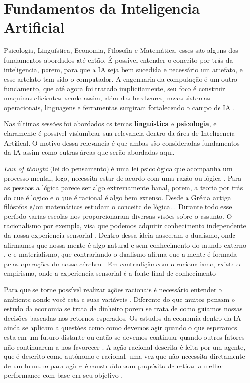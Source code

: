\section{Fundamentos da Inteligencia Artificial}

Psicologia, Linguística, Economia, Filosofia e Matemática, esses são alguns dos fundamentos abordados até então. É possível entender o conceito por trás da inteligencia, porem, para que a IA seja bem sucedida e necessário um artefato, e esse artefato tem sido o computador. A engenharia da computação é um outro fundamento, que até agora foi tratado implicitamente, seu foco é construir maquinas eficientes, sendo assim, além dos hardwares, novos sistemas operacionais, linguagens e ferramentas surgiram fortalecendo o campo de IA \cite[13-14]{russell2003artificial}.


Nas últimas sessões foi abordados os temas \textbf{linguistica} e \textbf{psicologia}, e claramente é possivel vislumbrar sua relevancia dentro da área de Inteligencia Artifical. O motivo dessa relevancia é que ambas são consideradas fundamentos da IA assim como outras áreas que serão abordadas aqui.

\textit{Law of thought} (lei do pensamento) é uma lei psicológica que acompanha um processo mental, logo, necessita estar de acordo com uma razão ou lógica \cite[289-291]{frege1956thought}. Para as pessoas a lógica parece ser algo extremamente banal, porem, a teoria por trás do que é logico e o que é racional é algo bem extenso. Desde a Grécia antiga filósofos e/ou matemáticos estudam o conceito de lógica. \cite[4-5]{russell2003artificial}. Durante todo esse período varias escolas nos proporcionaram diversas visões sobre o assunto. O racionalismo por exemplo, visa que podemos adquirir conhecimento independente da nossa experiencia sensorial \cite{rationalismvsempiricism}. Dentro dessa ideia nasceram o dualismo, onde afirmamos que nossa mente é algo natural e sem conhecimento do mundo externo \cite[7]{descartes2013rene}, e o materialismo, que contrariando o dualismo afirma que a mente é formada pelas operações do nosso cérebro \cite[6]{russell2003artificial}.
Em contradição com o racionalismo, existe o empirismo, onde a experiencia sensorial é a fonte final de conhecimento \cite{rationalismvsempiricism}.

Para que se torne possível realizar ações racionais é necessário entender o ambiente aonde você esta e suas variáveis \cite[99]{simon1955behavioral}. Diferente do que muitos pensam o estudo da economia se trata de dinheiro porem se trata de como guiamos nossas decisões baseadas nos retornos esperados. Os estudos da economia dentro da IA ainda se aplicam a questões como como devemos agir quando o que esperamos esta em um futuro distante ou então se devemos continuar quando outros fatores não continuarem a nos favorecer \cite[9]{russell2003artificial}. A ação racional descrita é feita por um agente, que é descrito como autônomo e racional, uma vez que não necessita diretamente de um humano para agir e é construído com propósito de retirar a melhor performance com base em seu objetivo \cite[2]{ wooldridge1994agent}.


